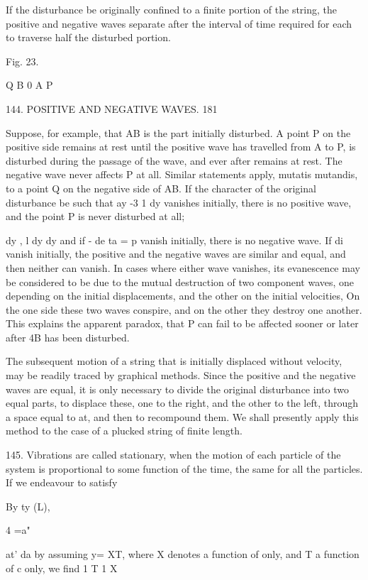 If the disturbance be originally confined to a finite portion of the
string, the positive and negative waves separate after the interval of
time required for each to traverse half the disturbed portion.

Fig. 23.

Q B 0 A P

144. POSITIVE AND NEGATIVE WAVES. 181

Suppose, for example, that AB is the part initially disturbed. A point P
on the positive side remains at rest until the positive wave has
travelled from A to P, is disturbed during the passage of the wave, and
ever after remains at rest. The negative wave never affects P at all.
Similar statements apply, mutatis mutandis, to a point Q on the negative
side of AB. If the character of the
original disturbance be such that ay -3 1 dy vanishes initially, there
is no positive wave, and the point P is never disturbed at all;

dy , l dy dy and if - de ta = p vanish initially, there is no negative
wave. If di
vanish initially, the positive and the negative waves are similar and
equal, and then neither can vanish. In cases where either wave vanishes,
its evanescence may be considered to be due to the mutual destruction of
two component waves, one depending on the initial displacements, and the
other on the initial velocities, On the one side these two waves
conspire, and on the other they destroy one another. This explains the
apparent paradox, that P can fail to be affected sooner or later after
4B has been disturbed.

The subsequent motion of a string that is initially displaced without
velocity, may be readily traced by graphical methods. Since the positive
and the negative waves are equal, it is only necessary to divide the
original disturbance into two equal parts, to displace these, one to the
right, and the other to the left, through a space equal to at, and then
to recompound them. We shall presently apply this method to the case of
a plucked string of finite length.

145. Vibrations are called stationary, when the motion of each particle
of the system is proportional to some function of the time, the same for
all the particles. If we endeavour to satisfy

By ty (L),

4 =a"

at' da by assuming y= XT, where X denotes a function of only, and T a
function of c only, we find 1 T 1 X

